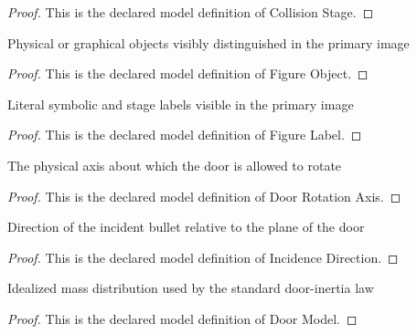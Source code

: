 \begin{proof}
  This is the declared model definition of Collision Stage.
\end{proof}
\begin{definition}
  \label{def:physics:phyx-mini-0827:phyxminiproblems-problemphyxmini0827-figureobject}
  Physical or graphical objects visibly distinguished in the primary image
\end{definition}
\begin{proof}
  This is the declared model definition of Figure Object.
\end{proof}
\begin{definition}
  \label{def:physics:phyx-mini-0827:phyxminiproblems-problemphyxmini0827-figurelabel}
  Literal symbolic and stage labels visible in the primary image
\end{definition}
\begin{proof}
  This is the declared model definition of Figure Label.
\end{proof}
\begin{definition}
  \label{def:physics:phyx-mini-0827:phyxminiproblems-problemphyxmini0827-doorrotationaxis}
  The physical axis about which the door is allowed to rotate
\end{definition}
\begin{proof}
  This is the declared model definition of Door Rotation Axis.
\end{proof}
\begin{definition}
  \label{def:physics:phyx-mini-0827:phyxminiproblems-problemphyxmini0827-incidencedirection}
  Direction of the incident bullet relative to the plane of the door
\end{definition}
\begin{proof}
  This is the declared model definition of Incidence Direction.
\end{proof}
\begin{definition}
  \label{def:physics:phyx-mini-0827:phyxminiproblems-problemphyxmini0827-doormodel}
  Idealized mass distribution used by the standard door-inertia law
\end{definition}
\begin{proof}
  This is the declared model definition of Door Model.
\end{proof}
